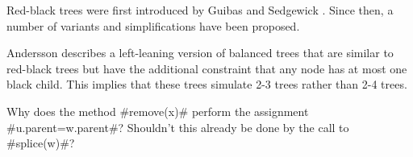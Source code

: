 Red-black trees were first introduced by Guibas and Sedgewick \cite{gs78}.
Since then, a number of variants and simplifications have been proposed.

Andersson describes a left-leaning version of balanced trees that are
similar to red-black trees but have the additional constraint that any
node has at most one black child.  This implies that these trees simulate
2-3 trees rather than 2-4 trees.




\begin{exc}
  Why does the method #remove(x)# perform the assignment
  #u.parent=w.parent#?  Shouldn't this already be done by the call
  to #splice(w)#?
\end{exc}
